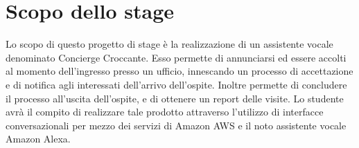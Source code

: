 \section*{Scopo dello stage}
Lo scopo di questo progetto di stage è la realizzazione di un assistente vocale denominato Concierge Croccante. Esso permette di annunciarsi ed essere accolti al momento dell'ingresso presso un ufficio, innescando un processo di accettazione e di notifica agli interessati dell'arrivo dell'ospite. Inoltre permette di concludere il processo all'uscita dell'ospite, e di ottenere un report delle visite.
Lo studente avrà il compito di realizzare tale prodotto attraverso l'utilizzo di interfacce conversazionali per mezzo dei servizi di Amazon AWS e il noto assistente vocale Amazon Alexa.

